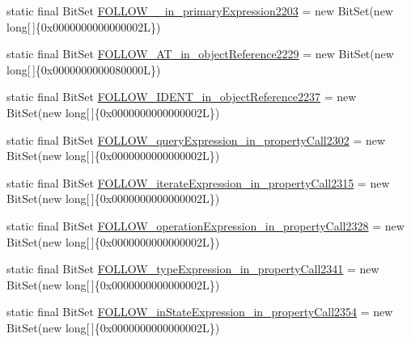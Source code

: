 \begin{DoxyCompactItemize}
\item 
static final Bit\-Set \hyperlink{classorg_1_1tzi_1_1use_1_1parser_1_1shell_1_1_shell_command_parser_a2a08cffdaa865d9caa66da91d3b25478}{F\-O\-L\-L\-O\-W\-\_\-\_\-in\-\_\-primary\-Expression2203} = new Bit\-Set(new long\mbox{[}$\,$\mbox{]}\{0x0000000000000002\-L\})
\item 
static final Bit\-Set \hyperlink{classorg_1_1tzi_1_1use_1_1parser_1_1shell_1_1_shell_command_parser_a11e84f5c66dcc886b87b5dafb2cc8076}{F\-O\-L\-L\-O\-W\-\_\-\-A\-T\-\_\-in\-\_\-object\-Reference2229} = new Bit\-Set(new long\mbox{[}$\,$\mbox{]}\{0x0000000000080000\-L\})
\item 
static final Bit\-Set \hyperlink{classorg_1_1tzi_1_1use_1_1parser_1_1shell_1_1_shell_command_parser_a71175f5c0b885c9c208c72dcc63cf75e}{F\-O\-L\-L\-O\-W\-\_\-\-I\-D\-E\-N\-T\-\_\-in\-\_\-object\-Reference2237} = new Bit\-Set(new long\mbox{[}$\,$\mbox{]}\{0x0000000000000002\-L\})
\item 
static final Bit\-Set \hyperlink{classorg_1_1tzi_1_1use_1_1parser_1_1shell_1_1_shell_command_parser_a823fa23742f0b59ac33c56b6f41ae1e5}{F\-O\-L\-L\-O\-W\-\_\-query\-Expression\-\_\-in\-\_\-property\-Call2302} = new Bit\-Set(new long\mbox{[}$\,$\mbox{]}\{0x0000000000000002\-L\})
\item 
static final Bit\-Set \hyperlink{classorg_1_1tzi_1_1use_1_1parser_1_1shell_1_1_shell_command_parser_ad2ca71d090190224c32733c4ade93912}{F\-O\-L\-L\-O\-W\-\_\-iterate\-Expression\-\_\-in\-\_\-property\-Call2315} = new Bit\-Set(new long\mbox{[}$\,$\mbox{]}\{0x0000000000000002\-L\})
\item 
static final Bit\-Set \hyperlink{classorg_1_1tzi_1_1use_1_1parser_1_1shell_1_1_shell_command_parser_af73c83ed7e082c08648aa243e88758e2}{F\-O\-L\-L\-O\-W\-\_\-operation\-Expression\-\_\-in\-\_\-property\-Call2328} = new Bit\-Set(new long\mbox{[}$\,$\mbox{]}\{0x0000000000000002\-L\})
\item 
static final Bit\-Set \hyperlink{classorg_1_1tzi_1_1use_1_1parser_1_1shell_1_1_shell_command_parser_a52f9e97a963e24ea4b4266f9486ecad3}{F\-O\-L\-L\-O\-W\-\_\-type\-Expression\-\_\-in\-\_\-property\-Call2341} = new Bit\-Set(new long\mbox{[}$\,$\mbox{]}\{0x0000000000000002\-L\})
\item 
static final Bit\-Set \hyperlink{classorg_1_1tzi_1_1use_1_1parser_1_1shell_1_1_shell_command_parser_a3559c5aa6a36a0b2f51e0b208e4f1c44}{F\-O\-L\-L\-O\-W\-\_\-in\-State\-Expression\-\_\-in\-\_\-property\-Call2354} = new Bit\-Set(new long\mbox{[}$\,$\mbox{]}\{0x0000000000000002\-L\})
\item 

\end{DoxyCompactItemize}
